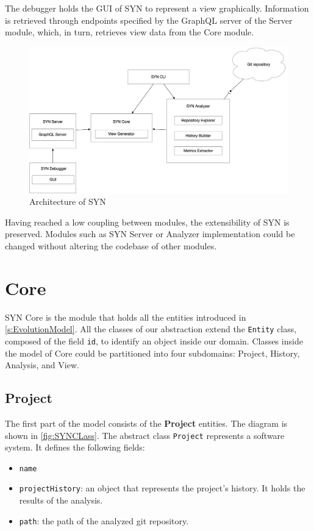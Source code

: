 The debugger holds the GUI of SYN to represent a view graphically. Information is retrieved through endpoints specified by the GraphQL server of the Server module, which, in turn, retrieves view data from the Core module. 


\begin{figure}
    \center
    \includegraphics[width=\textwidth]{SYNArchitecture.jpg}
    \caption{Architecture of SYN}
    \label{fig:architecture}
\end{figure}

Having reached a low coupling between modules, the extensibility of SYN is preserved. Modules such as SYN Server or Analyzer implementation could be changed without altering the codebase of other modules. 

\section{Core}
SYN Core is the module that holds all the entities introduced in \autoref{s:EvolutionModel}. 
All the classes of our abstraction extend the \texttt{Entity} class, composed of the field \texttt{id}, to identify an object inside our domain. 
Classes inside the model of Core could be partitioned into four subdomains: Project, History, Analysis, and View. 

\subsection*{Project}
The first part of the model consists of the \textbf{Project} entities. 
The diagram is shown in \autoref{fig:SYNCLass}. The abstract class \texttt{Project} represents a software system. It defines the following fields:
\begin{itemize}
    \item \texttt{name}
    \item \texttt{projectHistory}: an object that represents the project's history. It holds the results of the analysis. 
    \item \texttt{path}: the path of the analyzed git repository. 
\end{itemize}

